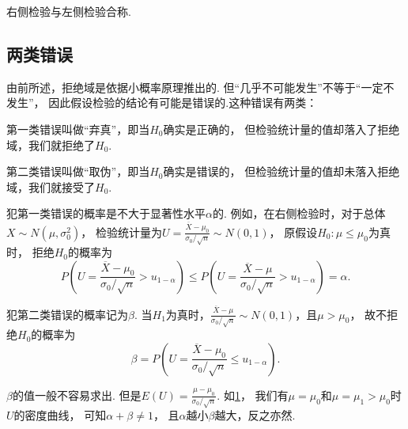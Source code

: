 右侧检验与左侧检验合称.

\subsection{两类错误}
由前所述，拒绝域是依据小概率原理推出的.
但“几乎不可能发生”不等于“一定不发生”，
因此假设检验的结论有可能是错误的.这种错误有两类：

第一类错误叫做“弃真”，即当\(H_0\)确实是正确的，
但检验统计量的值却落入了拒绝域，我们就拒绝了\(H_0\).

第二类错误叫做“取伪”，即当\(H_0\)确实是错误的，
但检验统计量的值却未落入拒绝域，我们就接受了\(H_0\).

犯第一类错误的概率是不大于显著性水平\(\alpha\)的.
例如，在右侧检验时，对于总体\(X \sim N(\mu,\sigma_0^2)\)，
检验统计量为\(U = \frac{\overline{X}-\mu_0}{\sigma_0 / \sqrt{n}} \sim N(0,1)\)，
原假设\(H_0: \mu\leq\mu_0\)为真时，
拒绝\(H_0\)的概率为\[
	P\left(U=\frac{\overline{X}-\mu_0}{\sigma_0 / \sqrt{n}}>u_{1-\alpha}\right)
	\leq P\left(U=\frac{\overline{X}-\mu}{\sigma_0 / \sqrt{n}}>u_{1-\alpha}\right)
	= \alpha.
\]

犯第二类错误的概率记为\(\beta\).
当\(H_1\)为真时，\(\frac{\overline{X}-\mu}{\sigma_0/\sqrt{n}} \sim N(0,1)\)，且\(\mu>\mu_0\)，
故不拒绝\(H_0\)的概率为\[
	\beta=P\left(U=\frac{\overline{X}-\mu_0}{\sigma_0/\sqrt{n}} \leq u_{1-\alpha}\right).
\]

\(\beta\)的值一般不容易求出.
但是\(E(U)=\frac{\mu-\mu_0}{\sigma_0/\sqrt{n}}\).
如\cref{figure:假设检验.两类错误}，
我们有\(\mu=\mu_0\)和\(\mu=\mu_1>\mu_0\)时\(U\)的密度曲线，
可知\(\alpha+\beta\neq1\)，
且\(\alpha\)越小\(\beta\)越大，反之亦然.

\begin{figure}[ht]
	\centering
	\caption{}
	\label{figure:假设检验.两类错误}
\end{figure}

